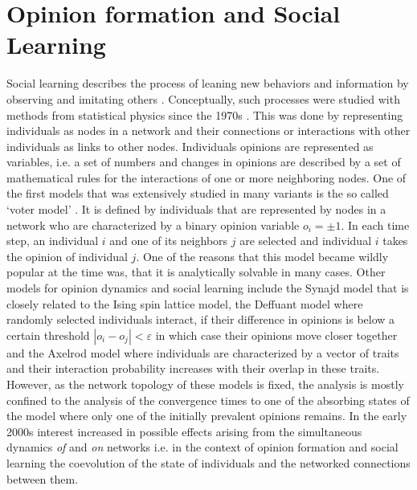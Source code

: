 \section{Opinion formation and Social Learning}
Social learning describes the process of leaning new behaviors and information by observing and imitating others \citep{Bandura1971}. 
Conceptually, such processes were studied with methods from statistical physics since the 1970s \citep[for a review see e.g.]{castellano2009statistical}. This was done by representing individuals as nodes in a network and their connections or interactions with other individuals as links to other nodes. Individuals opinions are represented as  variables, i.e. a set of numbers and changes in opinions are described by a set of mathematical rules for the interactions of one or more neighboring nodes. One of the first models that was extensively studied in many variants is the so called `voter model' \citep{Clifford1973, Holley1975}. It is defined by individuals that are represented by nodes in a network who are characterized by a binary opinion variable $o_i = \pm 1$. In each time step, an individual $i$ and one of its neighbors $j$ are selected and individual $i$ takes the opinion of individual $j$. One of the reasons that this model became wildly popular at the time was, that it is analytically solvable in many cases. 
Other models for opinion dynamics and social learning include the Synajd model \citep{Sznajd-Weron2000} that is closely related to the Ising spin lattice model, the Deffuant model \citep{Deffuant2000} where randomly selected individuals interact, if their difference in opinions is below a certain threshold $|o_i - o_j| < \varepsilon$ in which case their opinions move closer together and the Axelrod model \citep{Axelrod1997} where individuals are characterized by a vector of traits and their interaction probability increases with their overlap in these traits. However, as the network topology of these models is fixed, the analysis is mostly confined to the analysis of the convergence times to one of the absorbing states of the model where only one of the initially prevalent opinions remains.
In the early 2000s interest increased in possible effects arising from the simultaneous dynamics \emph{of} and \emph{on} networks \citep[for a review see]{Gross2008} i.e. in the context of opinion formation and social learning the coevolution of the state of individuals and the networked connections between them. 

